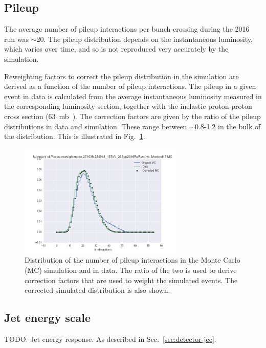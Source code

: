 \subsection{Pileup}
\label{sec:analysis-mccorrections-pileup}

The average number of pileup interactions per bunch crossing during the 2016 
run was $\sim$20. The pileup distribution depends on the instantaneous 
luminosity, which varies over time, and so is not reproduced very accurately by 
the simulation.

Reweighting factors to correct the pileup distribution in the simulation are 
derived as a function of the number of pileup interactions. The pileup in a 
given event in data is calculated from the average instantaneous luminosity 
measured in the corresponding luminosity section, together with the inelastic 
proton-proton cross section (63~mb~\cite{inelasticxs-atlas13tev}). The 
correction factors are given by the ratio of the pileup distributions in data 
and simulation. These range between $\sim$0.8-1.2 in the bulk of the 
distribution. This is illustrated in Fig.~\ref{fig:puweights}. 

\begin{figure}[h!]
\centering
\includegraphics[width=0.7\textwidth]{figs/analysis/pileup-weights.pdf}
\caption{Distribution of the number of pileup interactions in the Monte Carlo 
(MC) simulation and in data. The ratio of the two is used to derive correction 
factors that are used to weight the simulated events. The corrected simulated 
distribution is also shown.}
\label{fig:puweights}
\end{figure}

\subsection{Jet energy scale}
\label{sec:analysis-mccorrections-jec}
TODO. Jet energy response. As described in Sec.~\ref{sec:detector-jec}.


